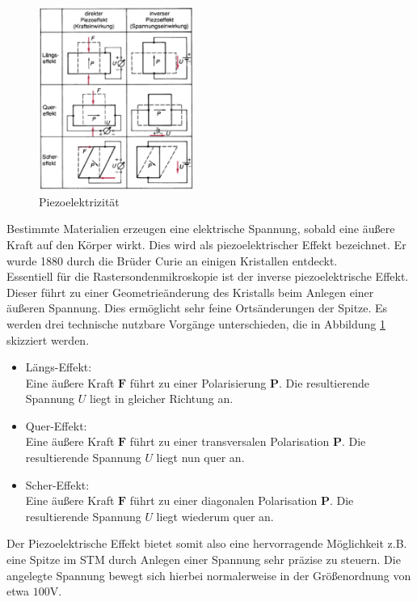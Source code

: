 \begin{figure}
	\includegraphics[width=0.45\textwidth]{Abb/piezo.png}
	\caption{Piezoelektrizität \cite{phying}}
	\label{piezo}
\end{figure}
Bestimmte Materialien erzeugen eine elektrische Spannung, sobald eine äußere Kraft
auf den Körper wirkt. Dies wird als piezoelektrischer Effekt bezeichnet. Er wurde
1880 durch die Brüder Curie an einigen Kristallen entdeckt.\\
Essentiell für die Rastersondenmikroskopie ist der inverse piezoelektrische Effekt.
Dieser führt zu einer Geometrieänderung des Kristalls beim Anlegen einer äußeren 
Spannung. Dies ermöglicht sehr feine Ortsänderungen der Spitze. Es werden drei 
technische nutzbare Vorgänge unterschieden, die in Abbildung \ref{piezo} skizziert
werden.
\begin{itemize}
	\item Längs-Effekt:\\
	Eine äußere Kraft $\textbf{F}$ führt zu einer Polarisierung $\textbf{P}$.
	Die resultierende Spannung $U$ liegt in gleicher Richtung an.
	\item Quer-Effekt:\\
	Eine äußere Kraft $\textbf{F}$ führt zu einer transversalen Polarisation
	$\textbf{P}$. Die resultierende Spannung $U$ liegt nun quer an.
	\item Scher-Effekt:\\
	Eine äußere Kraft $\textbf{F}$ führt zu einer diagonalen Polarisation
	$\textbf{P}$. Die resultierende Spannung $U$ liegt wiederum quer an.
\end{itemize} 
Der Piezoelektrische Effekt bietet somit also eine hervorragende Möglichkeit z.B. eine Spitze im STM durch Anlegen einer Spannung sehr präzise zu steuern. Die angelegte Spannung bewegt sich hierbei normalerweise in der Größenordnung von etwa $100\si{\volt}$.
    

